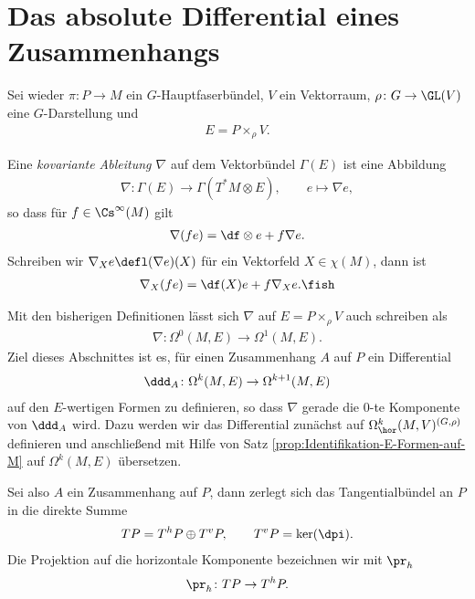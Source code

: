 \documentclass[%
	paper=a5,%
	fleqn,%
	DIV=18,%
	BCOR=0mm,
	fontsize=11pt,
	titlepage=false,%
	bibliography=totoc,
	DIV=18,%
	twoside=true,
	pdftitle=Riemannsche Geometrie,
	pdfauthor=Uwe Semmelmann,
	numbers=noendperiod]%
	{scrbook}
\begin{document}
\section{Das absolute Differential eines Zusammenhangs}

Sei wieder $\pi\colon P\to M$ ein $G$-Hauptfaserbündel, $V$ ein Vektorraum, $\rho\colon
G\to \GL(V)$ eine $G$-Darstellung und
\begin{align*}
E = P\times_\rho V.
\end{align*}

\begin{defn}
Eine \emph{kovariante Ableitung $\nabla$} auf dem Vektorbündel $\Gamma(E)$ ist
eine Abbildung
\begin{align*}
\nabla \colon \Gamma(E)\to \Gamma(T^*M\otimes E),\qquad
e \mapsto \nabla e,
\end{align*}
so dass für $f\in\Cs^\infty(M)$ gilt
\begin{align*}
\nabla (fe) = \df\otimes e + f\nabla e.
\end{align*}
Schreiben wir $\nabla_X e \defl (\nabla e)(X)$ für ein Vektorfeld $X\in\chi(M)$,
dann ist
\begin{align*}
\nabla_X(fe) = \df(X)e + f \nabla_X e.\fish
\end{align*} 
\end{defn}

Mit den bisherigen Definitionen lässt sich $\nabla$ auf $E=P\times_\rho V$ auch
schreiben als
\begin{align*}
\nabla \colon \Omega^0(M,E) \to \Omega^1(M,E).
\end{align*}
Ziel dieses Abschnittes ist es, für einen Zusammenhang $A$ auf $P$ ein
Differential
\begin{align*}
\ddd_A \colon \Omega^k(M,E)\to \Omega^{k+1}(M,E)
\end{align*}
auf den $E$-wertigen Formen zu definieren, so dass $\nabla$ gerade die $0$-te
Komponente von $\ddd_A$ wird. Dazu werden wir das Differential zunächst
auf $\Omega_\hor^k(M,V)^{(G,\rho)}$ definieren und anschließend mit Hilfe von
Satz \ref{prop:Identifikation-E-Formen-auf-M} auf $\Omega^k(M,E)$ übersetzen.

Sei also $A$ ein Zusammenhang auf $P$, dann zerlegt sich das Tangentialbündel an
$P$ in die direkte Summe
\begin{align*}
TP = T^hP\oplus T^vP,\qquad T^vP = \ker(\dpi).
\end{align*}
Die Projektion auf die horizontale Komponente bezeichnen wir mit $\pr_h$
\begin{align*}
\pr_h \colon TP \to T^hP.
\end{align*}
\end{document}
